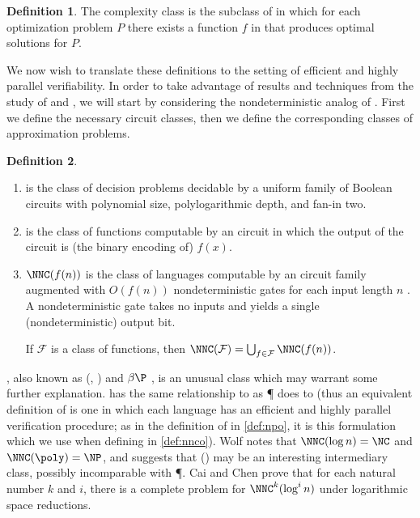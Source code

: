 \documentclass[]{article}
\theoremstyle{plain}
\theoremstyle{definition}
\newtheorem{definition}{Definition}
\begin{document}
\begin{definition}
  The complexity class \PO{} is the subclass of \NPO{} in which for each optimization problem $P$ there exists a function $f$ in \FP{} that produces optimal solutions for $P$.
\end{definition}

We now wish to translate these definitions to the setting of efficient and highly parallel verifiability.
In order to take advantage of results and techniques from the study of \NPO{} and \PO, we will start by considering the nondeterministic analog of \PO.
First we define the necessary circuit classes, then we define the corresponding classes of approximation problems.

\begin{definition}
  \mbox{}
  \begin{enumerate}
  \item \NC{} is the class of decision problems decidable by a uniform family of Boolean circuits with polynomial size, polylogarithmic depth, and fan-in two.
  \item \FNC{} is the class of functions computable by an \NC{} circuit in which the output of the circuit is (the binary encoding of) $f(x)$.
  \item $\NNC(f(n))$ is the class of languages computable by an \NC{} circuit family augmented with $O(f(n))$ nondeterministic gates for each input length $n$ \cite{wolf94}.
    A nondeterministic gate takes no inputs and yields a single (nondeterministic) output bit.

    If $\mathcal{F}$ is a class of functions, then $\NNC(\mathcal{F})=\bigcup_{f\in\mathcal{F}}{\NNC(f(n))}$.
  \end{enumerate}
\end{definition}

\NNCpoly, also known as \GC(\poly, \NC) \cite{cc97} and $\beta\P$ \cite{kf80}, is an unusual class which may warrant some further explanation.
\NC{} has the same relationship to \NNCpoly{} as \P{} does to \NP{} (thus an equivalent definition of \NNCpoly{} is one in which each language has an efficient and highly parallel verification procedure; as in the definition of \NPO{} in \autoref{def:npo}, it is this formulation which we use when defining \NNCO{} in \autoref{def:nnco}).
Wolf \cite{wolf94} notes that $\NNC(\log n)=\NC$ and $\NNC(\poly)=\NP$, and suggests that \NNC(\polylog) may be an interesting intermediary class, possibly incomparable with \P.
Cai and Chen \cite{cc97} prove that for each natural number $k$ and $i$, there is a complete problem for $\NNC^k(\log^i n)$ under logarithmic space reductions.
\end{document}
